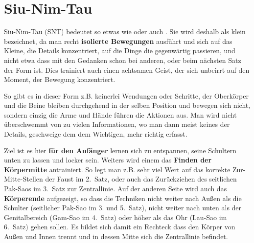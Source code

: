%



\section{Siu-Nim-Tau}





Siu-Nim-Tau (SNT) bedeutet so etwas wie  oder auch . Sie wird deshalb als klein bezeichnet, da man recht \textbf{isolierte Bewegungen} ausf\"uhrt und sich auf das Kleine, die Details konzentriert, auf die Dinge die gegenw\"artig passieren, und nicht etwa dass mit den Gedanken schon bei anderen, oder beim n\"achsten Satz der Form ist. Dies trainiert auch einen achtsamen Geist, der sich unbeirrt auf den Moment, der Bewegung konzentriert.

	So gibt es in dieser Form z.B. keinerlei Wendungen oder Schritte, der Oberk\"orper und die Beine bleiben durchgehend in der selben Position und bewegen sich nicht, sondern einzig die Arme und H\"ande f\"uhren die Aktionen aus. Man wird nicht \"uberschwemmt von zu vielen Informationen, wo man dann meist keines der Details, geschweige dem dem Wichtigen, mehr richtig erfasst.

Ziel ist es hier \textbf{f\"ur den Anf\"anger} lernen sich zu entspannen, seine Schultern unten zu lassen und locker sein. Weiters wird einem das \textbf{Finden der K\"orpermitte} antrainiert. So legt man z.B. sehr viel Wert auf das korrekte Zur-Mitte-Stellen der Faust im 2.~Satz, oder auch das Zur\"uckziehen des seitlichen Pak-Saos im 3.~Satz zur Zentrallinie. Auf der anderen Seite wird auch das \textbf{K\"orperende} aufgezeigt, so dass die Techniken nicht weiter nach Au{\ss}en als die Schulter (seitlicher Pak-Sao im 3. und 5.~Satz), nicht weiter nach unten als der Genitalbereich (Gam-Sao im 4.~Satz) oder h\"oher als das Ohr (Lau-Sao im 6.~Satz) gehen sollen. Es bildet sich damit ein Rechteck dass den K\"orper von Au{\ss}en und Innen trennt und in dessen Mitte sich die Zentrallinie befindet.



